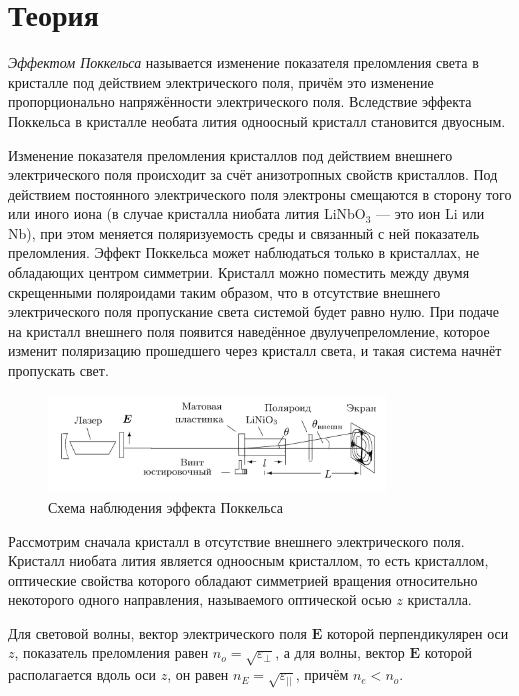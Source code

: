 \section*{Теория}

\textit{Эффектом Поккельса} называется изменение показателя преломления света в кристалле под действием электрического поля, причём
это изменение пропорционально напряжённости электрического поля.
Вследствие эффекта Поккельса в кристалле необата лития одноосный кристалл становится двуосным.

Изменение показателя преломления кристаллов под действием
внешнего электрического поля происходит за счёт анизотропных
свойств кристаллов. Под действием постоянного электрического поля
электроны смещаются в сторону того или иного иона (в случае
кристалла ниобата лития LiNbO$_3$ — это ион Li или Nb), при этом
меняется поляризуемость среды и связанный с ней показатель преломления. Эффект Поккельса может наблюдаться только в кристаллах, не обладающих центром симметрии. Кристалл можно поместить между двумя скрещенными
поляроидами таким образом, что в отсутствие внешнего электрического поля пропускание света системой будет равно нулю. При подаче
на кристалл внешнего поля появится наведённое двулучепреломление,
которое изменит поляризацию прошедшего через кристалл света, и
такая система начнёт пропускать свет.

\begin{figure}[H]
	\centering
	\includegraphics[width=0.8\textwidth]{../Изображения/scheme1.png}
	\caption{Схема наблюдения эффекта Поккельса}
\end{figure}

Рассмотрим сначала кристалл в отсутствие внешнего электрического поля. Кристалл ниобата лития является одноосным кристаллом, то
есть кристаллом, оптические свойства которого обладают симметрией
вращения относительно некоторого одного направления, называемого
оптической осью $z$ кристалла.

Для световой волны, вектор электрического поля $\boldsymbol{E}$ которой перпендикулярен оси $z$, показатель преломления равен $n_o = \sqrt{\varepsilon_\perp}$, а для волны, вектор $\boldsymbol{E}$ которой располагается вдоль оси $z$, он равен $n_E = \sqrt{\varepsilon_{||}}$, причём $n_e < n_o$.

